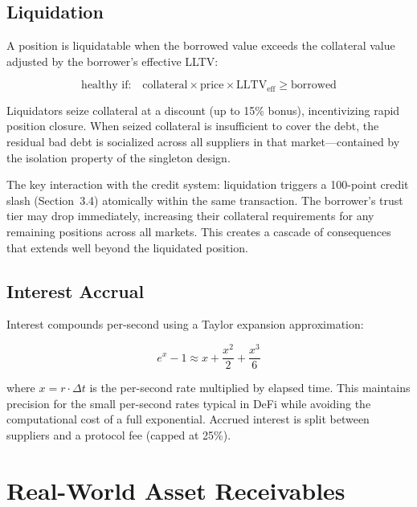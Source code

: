 \documentclass[11pt,a4paper]{article}
\begin{document}
\subsection{Liquidation}

A position is liquidatable when the borrowed value exceeds the collateral value adjusted by the borrower's effective LLTV:

\begin{equation}
\text{healthy if:}\quad \text{collateral} \times \text{price} \times \text{LLTV}_{\text{eff}} \geq \text{borrowed}
\end{equation}

Liquidators seize collateral at a discount (up to 15\% bonus), incentivizing rapid position closure. When seized collateral is insufficient to cover the debt, the residual bad debt is socialized across all suppliers in that market---contained by the isolation property of the singleton design.

The key interaction with the credit system: liquidation triggers a 100-point credit slash (Section~3.4) atomically within the same transaction. The borrower's trust tier may drop immediately, increasing their collateral requirements for any remaining positions across all markets. This creates a cascade of consequences that extends well beyond the liquidated position.

\subsection{Interest Accrual}

Interest compounds per-second using a Taylor expansion approximation:

\begin{equation}
e^{x} - 1 \approx x + \frac{x^2}{2} + \frac{x^3}{6}
\end{equation}

where $x = r \cdot \Delta t$ is the per-second rate multiplied by elapsed time. This maintains precision for the small per-second rates typical in DeFi while avoiding the computational cost of a full exponential. Accrued interest is split between suppliers and a protocol fee (capped at 25\%).

\section{Real-World Asset Receivables}
\end{document}
